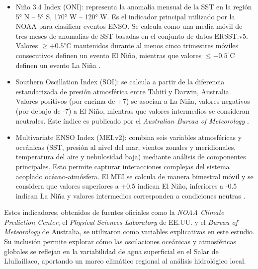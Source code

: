 \begin{itemize}
    \item Niño 3.4 Index (ONI): representa la anomalía mensual de la SST en la región 5° N – 5° S, 170° W – 120° W. Es el indicador principal utilizado por la NOAA para clasificar eventos ENSO. Se calcula como una media móvil de tres meses de anomalías de SST basadas en el conjunto de datos ERSST.v5. Valores $\geq +0.5^\circ$C mantenidos durante al menos cinco trimestres móviles consecutivos definen un evento El Niño, mientras que valores $\leq -0.5^\circ$C definen un evento La Niña \parencite{noaaONI}.
    
    \item Southern Oscillation Index (SOI): se calcula a partir de la diferencia estandarizada de presión atmosférica entre Tahití y Darwin, Australia. Valores positivos (por encima de +7) se asocian a La Niña, valores negativos (por debajo de -7) a El Niño, mientras que valores intermedios se consideran neutrales. Este índice es publicado por el \textit{Australian Bureau of Meteorology} \parencite{bom_soi_2024}.
    
    \item Multivariate ENSO Index (MEI.v2): combina seis variables atmosféricas y oceánicas (SST, presión al nivel del mar, vientos zonales y meridionales, temperatura del aire y nebulosidad baja) mediante análisis de componentes principales. Esto permite capturar interacciones complejas del sistema acoplado océano-atmósfera. El MEI se calcula de manera bimestral móvil y se considera que valores superiores a +0.5 indican El Niño, inferiores a -0.5 indican La Niña y valores intermedios corresponden a condiciones neutras \parencite{meiindex}.
\end{itemize}

Estos indicadores, obtenidos de fuentes oficiales como la \textit{NOAA Climate Prediction Center}, el \textit{Physical Sciences Laboratory} de EE.UU. y el \textit{Bureau of Meteorology} de Australia, se utilizaron como variables explicativas en este estudio. Su inclusión permite explorar cómo las oscilaciones oceánicas y atmosféricas globales se reflejan en la variabilidad de agua superficial en el Salar de Llullaillaco, aportando un marco climático regional al análisis hidrológico local.



